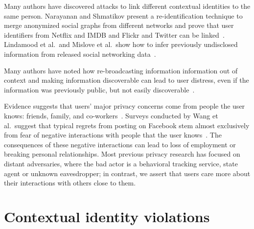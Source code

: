 \documentclass[10pt, conference, compsocconf]{IEEEtran}
\begin{document}
Many authors have discovered attacks to link different contextual identities to
the same person. Narayanan and Shmatikov present a re-identification technique
to merge anonymized social graphs from different networks and prove that
user identifiers from Netflix and IMDB and Flickr and Twitter can be
linked~\cite{narayanan1,narayanan2}. Lindamood et al.~and Mislove et al.~show
how to infer previously undisclosed information from released social networking
data~\cite{lindamood,mislove}.

Many authors have noted how re-broadcasting information information out of
context and making information discoverable can lead to user distress, even if
the information was previously public, but not easily
discoverable~\cite{boyd1,chew,nissenbaum}.

Evidence suggests that users' major privacy concerns come from people the user
knows: friends, family, and co-workers~\cite{fbtips2,fbtips1}.  Surveys
conducted by Wang et al.~suggest that typical regrets from posting on Facebook
stem almost exclusively from fear of negative interactions with people that the
user knows~\cite{wang}. The consequences of these negative interactions can
lead to loss of employment or breaking personal relationships.  Most previous
privacy research has focused on distant adversaries, where the bad actor is a
behavioral tracking service, state agent or unknown eavesdropper; in contrast,
we assert that users care more about their interactions with others close to
them.

\section{Contextual identity violations}
\label{sec:examples}
\end{document}
